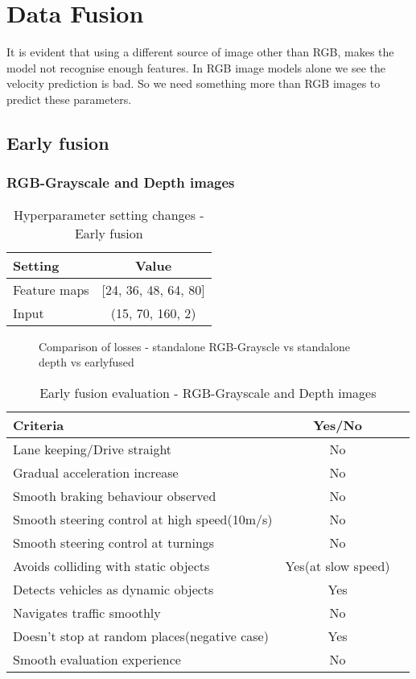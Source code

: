 \section{Data Fusion}
It is evident that using a different source of image other than RGB, makes the model not
recognise enough features. In RGB image models alone we see the velocity prediction is bad. So we need
something more than RGB images to predict these parameters.

\subsection{Early fusion}
\subsubsection*{RGB-Grayscale and Depth images}
\begin{table}[!ht]
    \centering
\begin{tabular}{lc}
    \toprule
    Setting  & Value  \\\midrule
    Feature maps  & [24, 36, 48, 64, 80]  \\
    Input  & (15, 70, 160, 2)\\\bottomrule
\end{tabular}
\caption{Hyperparameter setting changes - Early fusion}
\label{table:paramsEF}
\end{table}
\begin{figure}[!ht]
    \centering
    \def\svgwidth{\textwidth}
    \caption{Comparison of losses - standalone RGB-Grayscle vs standalone depth vs earlyfused}
    \label{fig:datafusionlosses1}
\end{figure}
\begin{table}[!ht]
    \centering
\begin{tabular}{lcc}
    \toprule
    Criteria  & Yes/No  \\\midrule
    Lane keeping/Drive straight  & No  \\
    Gradual acceleration increase  & No\\
    Smooth braking behaviour observed & No \\
    Smooth steering control at high speed(10m/s) & No \\
    Smooth steering control at turnings & No\\
    Avoids colliding with static objects & Yes(at slow speed) \\
    Detects vehicles as dynamic objects & Yes \\
    Navigates traffic smoothly & No\\
    Doesn't stop at random places(negative case) & Yes \\
    Smooth evaluation experience & No \\\bottomrule
\end{tabular}
\caption{Early fusion evaluation - RGB-Grayscale and Depth images}
\label{table:earlyfusionrgbdepth}
\end{table}


